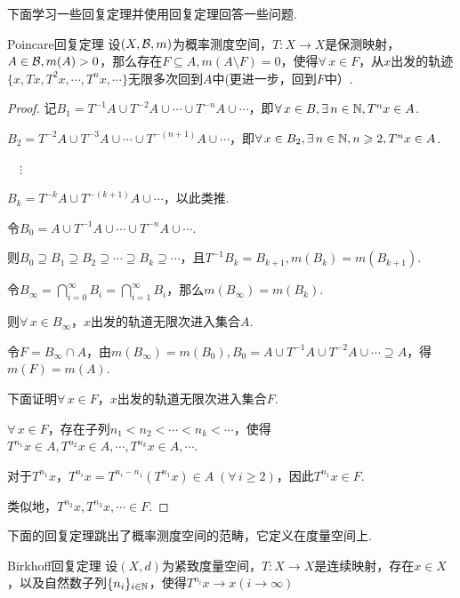 下面学习一些回复定理并使用回复定理回答一些问题.\par
\begin{theorem}{Poincare回复定理}
    设$(X,\mathcal{B},m)$为概率测度空间，$T:X\to X$是保测映射，$A\in\mathcal{B},m(A)>0$，那么存在$F\subseteq A,m(A\setminus F)=0$，使得$\forall\, x\in F$，从$x$出发的轨迹$\{x,Tx,T^2x,\cdots,T^nx,\cdots\}$无限多次回到$A$中(更进一步，回到$F$中）.
\end{theorem}
\begin{proof}
    记$B_1=T^{-1}A\cup T^{-2}A\cup\cdots\cup T^{-n}A\cup\cdots$，即$\forall\, x\in B,\exists\, n\in\mathbb{N},T^nx\in A$.\par
    $B_2=T^{-2}A\cup T^{-3}A\cup\cdots\cup T^{-(n+1)}A\cup\cdots$，即$\forall\, x\in B_2,\exists\, n\in\mathbb{N},n\geqslant 2,T^nx\in A$.\par
    $\quad\vdots$\par
    $B_k=T^{-k}A\cup T^{-(k+1)}A\cup\cdots$，以此类推.\par
    令$B_0=A\cup T^{-1}A\cup\cdots\cup T^{-n}A\cup\cdots$.\par
    则$B_0\supseteq B_1\supseteq B_2\supseteq\cdots\supseteq B_k\supseteq\cdots$，且$T^{-1}B_k=B_{k+1},m(B_k)=m(B_{k+1})$.\par
    令$B_\infty=\bigcap_{i=0}^\infty{B_i}=\bigcap_{i=1}^\infty{B_i}$，那么$m(B_\infty)=m(B_k)$.\par
    则$\forall\, x\in B_\infty$，$x$出发的轨道无限次进入集合$A$.\par
    令$F=B_\infty\cap A$，由$m(B_\infty)=m(B_0),B_0=A\cup T^{-1}A\cup T^{-2}A\cup\cdots\supseteq A$，得$m(F)=m(A)$.\par
    下面证明$\forall\, x\in F$，$x$出发的轨道无限次进入集合$F$.\par
    $\forall\, x\in F$，存在子列$n_1<n_2<\cdots<n_k<\cdots$，使得$T^{n_1}x\in A,T^{n_2}x\in A,\cdots,T^{n_k}x\in A,\cdots$.\par
    对于$T^{n_1}x$，$T^{n_i}x=T^{n_i-n_1}\left(T^{n_1}x\right)\in A\;(\forall\, i\geq 2)$，因此$T^{n_1}x\in F$.\par
    类似地，$T^{n_2}x,T^{n_3}x,\cdots\in F$.
\end{proof}

下面的回复定理跳出了概率测度空间的范畴，它定义在度量空间上.
\begin{theorem}{Birkhoff回复定理}
    设$(X,d)$为紧致度量空间，$T:X\to X$是连续映射，存在$x\in X$，以及自然数子列$\{n_i\}_{i\in\mathbb{N}}$，使得$T^{n_i}x\to x(i\to\infty)$
\end{theorem}

